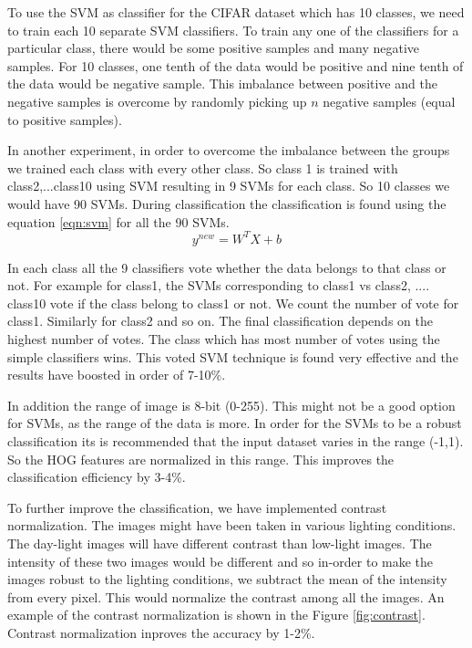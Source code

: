 \documentclass{article} %
\begin{document}
	To use the SVM as classifier for the CIFAR dataset which has 10 classes, we need to train each 10 separate SVM classifiers. To train any one of the classifiers for a particular class, there would be some positive samples and many negative samples. For 10 classes, one tenth of the data would be positive and nine tenth of the data would be negative sample. This imbalance between positive and the negative samples is overcome by randomly picking up  $n$ negative samples (equal to positive samples).
	
	In another experiment, in order to overcome the imbalance between the groups we trained each class with every other class. So class 1 is trained with class2,...class10 using SVM resulting in 9 SVMs for each class. So 10 classes we would have 90 SVMs. During classification the classification is found using the equation \ref{eqn:svm} for all the 90 SVMs.
	\begin{equation}
	\label{eqn:svm}
		y^{new} = W^T X + b	
	\end{equation}
	
In each class all the 9 classifiers vote whether the data belongs to that class or not. For example for class1, the SVMs corresponding to class1 vs class2, .... class10 vote if the class belong to class1 or not. We count the number of vote for class1. Similarly for class2 and so on. The final classification depends on the highest number of votes. The class which has most number of votes using the simple classifiers wins. This voted SVM technique is found very effective and the results have boosted in order of 7-10\%.

In addition the range of image is 8-bit (0-255). This might not be a good option for SVMs, as the range of the data is more. In order for the SVMs to be a robust classification its is recommended that the input dataset varies in the range (-1,1). So the HOG features are normalized in this range. This improves the classification efficiency by 3-4\%.

To further improve the classification, we have implemented contrast normalization. The images might have been taken in various lighting conditions. The day-light images will have different contrast than low-light images. The intensity of these two images would be different and so in-order to make the images robust to the lighting conditions, we subtract the mean of the intensity from every pixel. This would normalize the contrast among all the images. An example of the contrast normalization is shown in the Figure \ref{fig:contrast}. Contrast normalization inproves the accuracy by 1-2\%.
\end{document}
